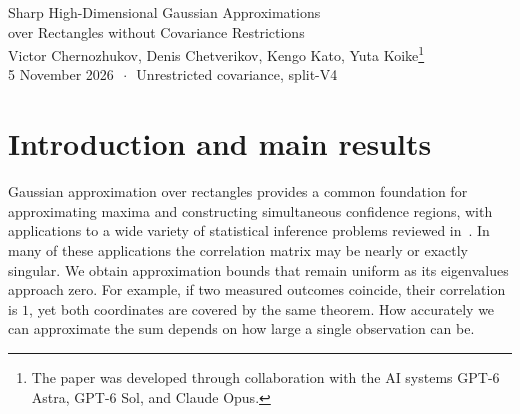 \documentclass[11pt,letterpaper]{article}
\theoremstyle{remark}
\begin{document}
\begin{center}
{\Large Sharp High-Dimensional Gaussian Approximations\\[0.15em]
over Rectangles without Covariance Restrictions}\\[0.85em]
{\normalsize Victor Chernozhukov, Denis Chetverikov, Kengo Kato, Yuta
Koike\renewcommand{\thefootnote}{\fnsymbol{footnote}}\footnote{The paper
was developed through collaboration with the AI systems GPT-6 Astra,
GPT-6 Sol, and Claude Opus.}}\\[0.65em]
{\normalsize 5 November 2026 \(\,\cdot\,\) Unrestricted covariance, split-V4}
\end{center}
\setcounter{footnote}{0}
\thispagestyle{plain}

\begin{abstract}

We study how well a sum of \(n\) independent random vectors with \(p\)
coordinates can be approximated by a Gaussian vector with the same
mean and covariance. We measure the error over rectangles, so the bounds apply
to maxima and simultaneous confidence regions. The coordinates may
be arbitrarily dependent, even exactly linearly dependent, and the
bounds do not deteriorate as the covariance matrix becomes singular.
After standardizing the coordinate variances, bounded or
sub-exponential coordinates give the familiar \(n^{-1/2}\) sample-size
rate up to logarithmic factors, with the size or tail bounds held
fixed. For bounded coordinates, a refinement uses fourth moments to
reduce the logarithmic loss when large observations contribute little
to the variance. If we instead impose a fixed moment bound of order
\(q>4\) on the largest absolute coordinate, together with a coordinate
fourth-moment bound, the rate becomes \(n^{-1/2+1/q}\) up to
logarithmic factors. At \(q=4\), the slower \(n^{-1/4}\) rate is
unavoidable, confirming our earlier conjecture. We also allow the
bounds on observation size to grow with \(n\). Lower-bound examples
show that the dependence on sample size and observation size is sharp
up to logarithmic factors in the regimes studied, and in several
regimes the upper and lower bounds match including the logarithmic
terms.
\end{abstract}

\begingroup
\setcounter{tocdepth}{1}
\small
\tableofcontents
\endgroup
\clearpage

\section{\texorpdfstring{Introduction and main results}{Introduction and main results}}\label{sec:results}
Gaussian approximation over rectangles provides a common foundation for
approximating maxima and constructing simultaneous confidence regions, with
applications to a wide variety of statistical inference problems reviewed in~\cite{CCKK2023}.
In many of these applications the correlation matrix may be nearly or
exactly singular. We obtain approximation bounds that remain uniform
as its eigenvalues approach zero. For example, if two measured outcomes
coincide, their correlation is \(1\), yet both coordinates are covered
by the same theorem. How accurately we can approximate the sum depends on how large a
single observation can be.
\end{document}
